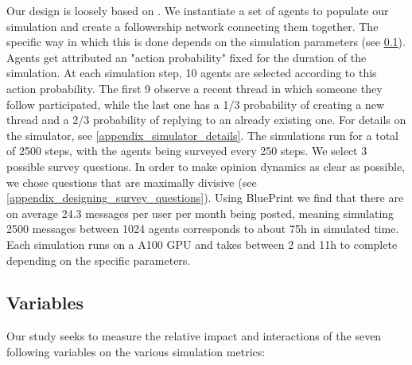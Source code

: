 \documentclass{article} %
\begin{document}
Our design is loosely based on \cite{vezhnevets2023generative}. We instantiate a set of agents to populate our simulation and create a followership network connecting them together. The specific way in which this is done depends on the simulation parameters (see \ref{sim_parameters}). Agents get attributed an "action probability" fixed for the duration of the simulation. At each simulation step, 10 agents are selected according to this action probability. The first 9 observe a recent thread in which someone they follow participated, while the last one has a 1/3 probability of creating a new thread and a 2/3 probability of replying to an already existing one. For details on the simulator, see \ref{appendix_simulator_details}. The simulations run for a total of 2500 steps, with the agents being surveyed every 250 steps. We select 3 possible survey questions. In order to make opinion dynamics as clear as possible, we chose questions that are maximally divisive (see \ref{appendix_designing_survey_questions}). Using BluePrint \citep{bückkaeffer2025textttblueprintsocialmediauser} we find that there are on average 24.3 messages per user per month being posted, meaning simulating 2500 messages between 1024 agents corresponds to about 75h in simulated time. Each simulation runs on a A100 GPU and takes between 2 and 11h to complete depending on the specific parameters.

\subsection{Variables}
\label{sim_parameters}

Our study seeks to measure the relative impact and interactions of the seven following variables on the various simulation metrics:
\end{document}

